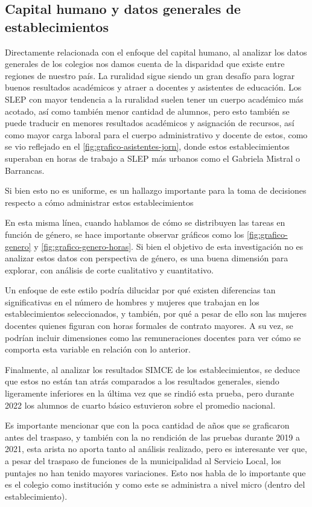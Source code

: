 \documentclass[
  12pt,
  letterpaper,
]{article}
\begin{document}
\subsection{Capital humano y datos generales de establecimientos}\label{capital-humano-y-datos-generales-de-establecimientos}

Directamente relacionada con el enfoque del capital humano, al analizar los datos generales de los colegios nos damos cuenta de la disparidad que existe entre regiones de nuestro país.
La ruralidad sigue siendo un gran desafío para lograr buenos resultados académicos y atraer a docentes y asistentes de educación.
Los SLEP con mayor tendencia a la ruralidad suelen tener un cuerpo académico más acotado, así como también menor cantidad de alumnos, pero esto también se puede traducir en menores resultados académicos y asignación de recursos, así como mayor carga laboral para el cuerpo administrativo y docente de estos, como se vio reflejado en el \ref{fig:grafico-asistentes-jorn}, donde estos establecimientos superaban en horas de trabajo a SLEP más urbanos como el Gabriela Mistral o Barrancas.

Si bien esto no es uniforme, es un hallazgo importante para la toma de decisiones respecto a cómo administrar estos establecimientos

En esta misma línea, cuando hablamos de cómo se distribuyen las tareas en función de género, se hace importante observar gráficos como los \ref{fig:grafico-genero} y \ref{fig:grafico-genero-horas}.
Si bien el objetivo de esta investigación no es analizar estos datos con perspectiva de género, es una buena dimensión para explorar, con análisis de corte cualitativo y cuantitativo.

Un enfoque de este estilo podría dilucidar por qué existen diferencias tan significativas en el número de hombres y mujeres que trabajan en los establecimientos seleccionados, y también, por qué a pesar de ello son las mujeres docentes quienes figuran con horas formales de contrato mayores.
A su vez, se podrían incluir dimensiones como las remuneraciones docentes para ver cómo se comporta esta variable en relación con lo anterior.

Finalmente, al analizar los resultados SIMCE de los establecimientos, se deduce que estos no están tan atrás comparados a los resultados generales, siendo ligeramente inferiores en la última vez que se rindió esta prueba, pero durante 2022 los alumnos de cuarto básico estuvieron sobre el promedio nacional.

Es importante mencionar que con la poca cantidad de años que se graficaron antes del traspaso, y también con la no rendición de las pruebas durante 2019 a 2021, esta arista no aporta tanto al análisis realizado, pero es interesante ver que, a pesar del traspaso de funciones de la municipalidad al Servicio Local, los puntajes no han tenido mayores variaciones.
Esto nos habla de lo importante que es el colegio como institución y como este se administra a nivel micro (dentro del establecimiento).
\end{document}
